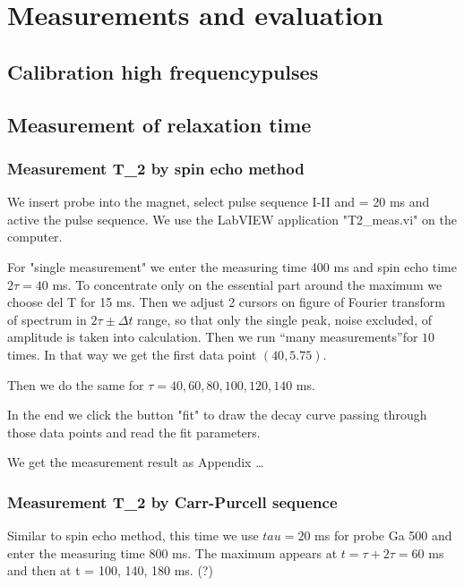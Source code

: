 \section{Measurements and evaluation}\label{measurements-and-evaluation}

\subsection{Calibration high frequencypulses}\label{calibration-high-frequency-pulses}

\subsection{Measurement of relaxation time}\label{relaxation-time}

\subsubsection{Measurement T\_2 by spin echo method}\label{t_2-by-spin}

We insert probe into the magnet, select pulse sequence I-II and
\tau = 20 ms and active the pulse sequence. We use the LabVIEW
application "T2_meas.vi" on the computer.

For "single measurement" we enter the measuring time 400​ ms and
spin echo time $2\tau = 40​$ ms. To concentrate only on the essential
part around the maximum we choose del T for 15​ ms. Then we adjust 2
cursors on figure of Fourier transform of spectrum in
$2\tau \pm \Delta t$ range, so that only the single peak, noise
excluded, of amplitude is taken into calculation. Then we run ``many
measurements''for $10$ times. In that way we get the first data point
$(40, 5.75)$.

Then we do the same for $\tau = 40,60,80,100,120, 140$ ms.

In the end we click the button "fit" to draw the decay curve passing
through those data points and read the fit parameters.

We get the measurement result as Appendix \ldots{}

\subsubsection{Measurement T\_2 by Carr-Purcell sequence}\label{t_2-carr}

Similar to spin echo method, this time we use $tau = 20$ ms for probe
Ga 500 and enter the measuring time 800 ms. The maximum appears at
$t= \tau + 2 \tau = 60$ ms and then at t = 100, 140, 180 ms. (?)

